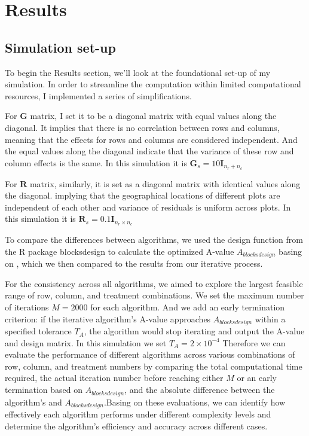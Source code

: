 \documentclass[
  a4paper,
  oneside,
  openany,
  12pt,
  onecolumn]{book}
\theoremstyle{plain}
\theoremstyle{definition}
\theoremstyle{remark}
\begin{document}

\chapter{Results}\label{sec-results}

\section{Simulation set-up}\label{simulation-set-up}

To begin the Results section, we'll look at the foundational set-up of
my simulation. In order to streamline the computation within limited
computational resources, I implemented a series of simplifications.

For \(\boldsymbol{G}\) matrix, I set it to be a diagonal matrix with
equal values along the diagonal. It implies that there is no correlation
between rows and columns, meaning that the effects for rows and columns
are considered independent. And the equal values along the diagonal
indicate that the variance of these row and column effects is the same.
In this simulation it is
\(\boldsymbol{G}_s = 10\boldsymbol{I}_{n_r+n_c}\)

For \(\boldsymbol{R}\) matrix, similarly, it is set as a diagonal matrix
with identical values along the diagonal. implying that the geographical
locations of different plots are independent of each other and variance
of residuals is uniform across plots. In this simulation it is
\(\boldsymbol{R}_s = 0.1\boldsymbol{I}_{n_r\times n_c}\)

To compare the differences between algorithms, we used the design
function from the R package blocksdesign to calculate the optimized
A-value \(A_{blocksdesign}\) basing on \citet{edmondson2020multi}, which
we then compared to the results from our iterative process.

For the consistency across all algorithms, we aimed to explore the
largest feasible range of row, column, and treatment combinations. We
set the maximum number of iterations \(M=2000\) for each algorithm. And
we add an early termination criterion: if the iterative algorithm's
A-value approaches \(A_{blocksdesign}\) within a specified tolerance
\(T_A\), the algorithm would stop iterating and output the A-value and
design matrix. In this simulation we set \(T_A=2\times 10^{-4}\)
Therefore we can evaluate the performance of different algorithms across
various combinations of row, column, and treatment numbers by comparing
the total computational time required, the actual iteration number
before reaching either \(M\) or an early termination based on
\(A_{blocksdesign}\), and the absolute difference between the
algorithm's and \(A_{blocksdesign}\).Basing on these evaluations, we can
identify how effectively each algorithm performs under different
complexity levels and determine the algorithm's efficiency and accuracy
across different cases.
\end{document}

